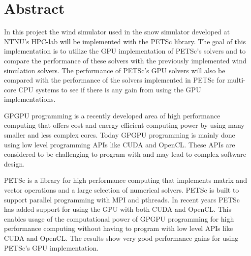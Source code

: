 \section*{Abstract}

In this project the wind simulator used in the snow simulator developed at
NTNU's HPC-lab will be implemented with the PETSc library. The goal of this
implementation is to utilize the GPU implementation of PETSc's solvers and to
compare the performance of these solvers with the previously implemented wind
simulation solvers. The performance of PETSc's GPU solvers will also be compared
with the performance of the solvers implemented in PETSc for multi-core CPU
systems to see if there is any gain from using the GPU implementations.

GPGPU programming is a recently developed area of high performance computing that
offers cost and energy efficient computing power by using many smaller and less
complex cores. Today GPGPU programming is mainly done using low level programming
APIs like CUDA and OpenCL. These APIs are considered to be challenging to
program with and may lead to complex software design.

PETSc is a library for high performance computing that implements matrix and vector
operations and a large selection of numerical solvers. PETSc is built to support
parallel programming with MPI and pthreads. In recent years PETSc has added
support for using the GPU with both CUDA and OpenCL. This enables usage of the
computational power of GPGPU programming for high performance
computing without having to program with low level APIs like CUDA and OpenCL.
The results show very good performance gains for using PETSc's GPU implementation.
